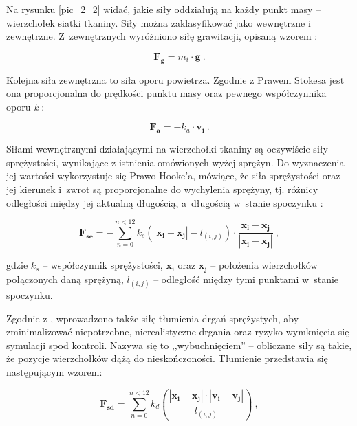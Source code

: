 			
			
			
			Na rysunku \ref{pic_2_2} widać, jakie siły oddziałują na każdy punkt masy -- wierzchołek siatki tkaniny. Siły można zaklasyfikować jako wewnętrzne i zewnętrzne. Z~zewnętrznych wyróżniono siłę grawitacji, opisaną wzorem \cite{cloth-dobre-wzory}:
			
			\begin{equation}
			\mathbf{F_{g}} = m_{i} \cdot \mathbf{g} \ .
			\end{equation}
			
			Kolejna siła zewnętrzna to siła oporu powietrza. Zgodnie z Prawem Stokesa jest ona proporcjonalna do prędkości punktu masy oraz pewnego współczynnika oporu \emph{k} \cite{cloth-dobre-wzory}:
			
			\begin{equation}
			\mathbf{F_{a}} = -k_{a} \cdot \mathbf{v_{i}} \ .
			\end{equation}
			
			Siłami wewnętrznymi działającymi na wierzchołki tkaniny są oczywiście siły sprężystości, wynikające z istnienia omówionych wyżej sprężyn. Do wyznaczenia jej wartości wykorzystuje się Prawo Hooke'a, mówiące, że siła sprężystości oraz jej kierunek i~zwrot są proporcjonalne do wychylenia sprężyny, tj. różnicy odległości między jej aktualną długością, a~długością w~stanie spoczynku \cite{cloth-dobre-wzory}:
			
			\begin{equation}
			\mathbf{F_{se}} = - \sum_{n = 0}^{n < 12} k_{s} (|\mathbf{x_{i}} - \mathbf{x_{j}}| - l_{(i, j)}) \cdot \frac{\mathbf{x_{i}} - \mathbf{x_{j}}}{|\mathbf{x_{i}} - \mathbf{x_{j}}|} \ ,
			\end{equation}
			
			gdzie \(k_{s}\) -- współczynnik sprężystości, \(\mathbf{x_{i}}\) oraz \(\mathbf{x_{j}}\) -- położenia wierzchołków połączonych daną sprężyną, \(l_{(i, j)}\) -- odległość między tymi punktami w~stanie spoczynku.
			
			Zgodnie z \cite{receptury}, wprowadzono także siłę tłumienia drgań sprężystych, aby zminimalizować niepotrzebne, nierealistyczne drgania oraz ryzyko wymknięcia się symulacji spod kontroli. Nazywa się to ,,wybuchnięciem'' -- obliczane siły są takie, że pozycje wierzchołków dążą do nieskończoności. Tłumienie przedstawia się następującym wzorem:
			
			\begin{equation}
			\mathbf{F_{sd}} = \sum_{n = 0}^{n < 12} k_{d} (\frac{|\mathbf{x_{i}} - \mathbf{x_{j}}| \cdot |\mathbf{v_{i}} - \mathbf{v_{j}}|}{l_{(i, j)}}) \ ,
			\end{equation}
			
